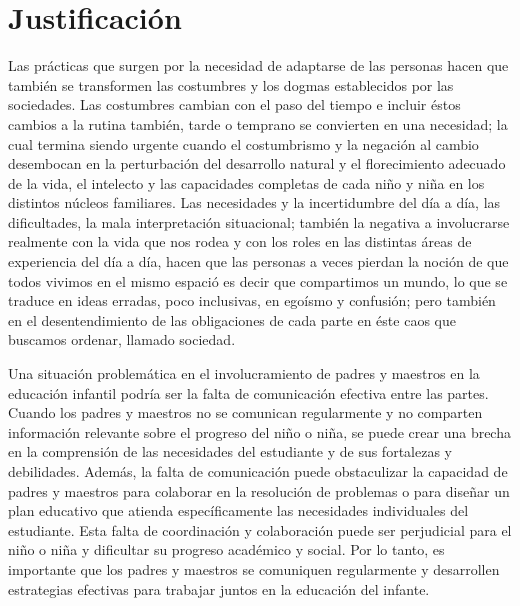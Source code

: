 \section{Justificación}
\hspace{2cm}Las prácticas que surgen por la necesidad de adaptarse de las personas hacen que también
se transformen las costumbres y los dogmas establecidos por las sociedades. Las costumbres
cambian con el paso del tiempo e incluir éstos cambios a la rutina también, tarde o temprano se
convierten en una necesidad; la cual termina siendo urgente cuando el costumbrismo y la
negación al cambio desembocan en la perturbación del desarrollo natural y el florecimiento
adecuado de la vida, el intelecto y las capacidades completas de cada niño y niña en los distintos
núcleos familiares.
Las necesidades y la incertidumbre del día a día, las dificultades, la mala interpretación
situacional; también la negativa a involucrarse realmente con la vida que nos rodea y con los
roles en las distintas áreas de experiencia del día a día, hacen que las personas a veces pierdan la
noción de que todos vivimos en el mismo espació es decir que compartimos un mundo, lo que se
traduce en ideas erradas, poco inclusivas, en egoísmo y confusión; pero también en el
desentendimiento de las obligaciones de cada parte en éste caos que buscamos ordenar, llamado
sociedad.


\vspace{1cm}Una situación problemática en el involucramiento de padres y maestros en la educación
infantil podría ser la falta de comunicación efectiva entre las partes. Cuando los padres y maestros no se comunican regularmente y no comparten información relevante sobre el progreso del niño o niña, se puede crear una brecha en la comprensión de las necesidades del estudiante y
de sus fortalezas y debilidades. Además, la falta de comunicación puede obstaculizar la
capacidad de padres y maestros para colaborar en la resolución de problemas o para diseñar un
plan educativo que atienda específicamente las necesidades individuales del estudiante. Esta falta
de coordinación y colaboración puede ser perjudicial para el niño o niña y dificultar su progreso
académico y social. Por lo tanto, es importante que los padres y maestros se comuniquen
regularmente y desarrollen estrategias efectivas para trabajar juntos en la educación del infante.

